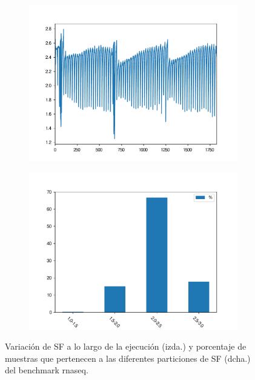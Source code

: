 \begin{figure}
\centering
\begin{subfigure}{.5\textwidth}
  \centering
  \includegraphics[width=1\linewidth]{sf_over_time_rnaseq.pdf}
\end{subfigure}%
\begin{subfigure}{.5\textwidth}
  \centering
  \includegraphics[width=.99\linewidth]{sf_partitions_rnaseq.pdf}
\end{subfigure}
\caption{Variación de SF a lo largo de la ejecución (izda.) y porcentaje de muestras que pertenecen a las diferentes particiones de SF (dcha.) del benchmark rnaseq.}
\label{fig:b1}
\end{figure}

